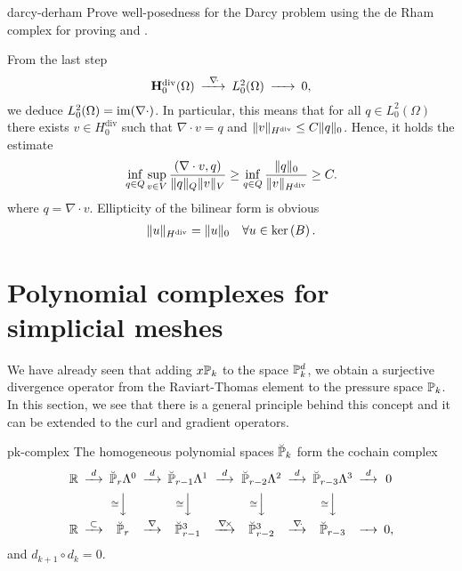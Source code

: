 \begin{Problem}{darcy-derham}
  Prove well-posedness for the Darcy problem using the de Rham complex
  for proving  and
  .
\begin{solution}
From the last step
 \begin{gather}\minCDarrowwidth20pt
    \begin{CD}
      \Hdiv_0(\domain)
      @>{\div}>> L^2_0(\domain)
      @>>> 0,
    \end{CD}
  \end{gather}
we deduce $L_0^2(\Omega)=\range{\nabla\cdot}$. In particular, this means
that for all $q\in L_0^2(\Omega)$ there exists $v\in H_0^{\text{div}}$ such that
$\nabla \cdot v=q$ and $\norm{v}_{H^{\text{div}}}\leq C \norm{q}_0$.
Hence, it holds the estimate
\begin{align}
\inf_{q\in Q}\sup_{v\in V}\frac{(\nabla \cdot v, q)}{\norm{q}_Q\norm{v}_V}
  \geq \inf_{q\in Q} \frac{\norm{q}_0}{\norm{v}_{H^{\text{div}}}}\geq C.
\end{align}
where $q = \nabla \cdot v$. Ellipticity of the bilinear form is obvious
\begin{align}
  \norm{u}_{H^{\text{div}}}=\norm{u}_0 \quad \forall u\in \ker B.
\end{align}
\end{solution}
\end{Problem}

\section{Polynomial complexes for simplicial meshes}

\begin{intro}
  We have already seen that adding $x\P_k$ to the space $\P_k^d$, we
  obtain a surjective divergence operator from the Raviart-Thomas
  element to the pressure space $\P_k$. In this section, we see that
  there is a general principle behind this concept and it can be
  extended to the curl and gradient operators.
\end{intro}

\begin{Notation}{pk-complex}
  The homogeneous polynomial spaces $\breve\P_k$ form the cochain complex
  \begin{gather}\minCDarrowwidth15pt
    \begin{CD}
      \R
      @>{d}>> \breve\P_r\Lambda^0
      @>{d}>> \breve\P_{r-1}\Lambda^1
      @>{d}>> \breve\P_{r-2}\Lambda^2
      @>{d}>> \breve\P_{r-3}\Lambda^3
      @>{d}>> 0
      \\
      @.
      @V{\cong}VV
      @V{\cong}VV
      @V{\cong}VV
      @V{\cong}VV
      \\
      \R
      @>{\subset}>> \breve\P_r
      @>{\nabla}>> \breve\P_{r-1}^3
      @>{\curl}>> \breve\P_{r-2}^3
      @>{\div}>> \breve\P_{r-3}
      @>>> 0,
    \end{CD}
  \end{gather}
  and $d_{k+1}\circ d_k = 0$.
\end{Notation}

